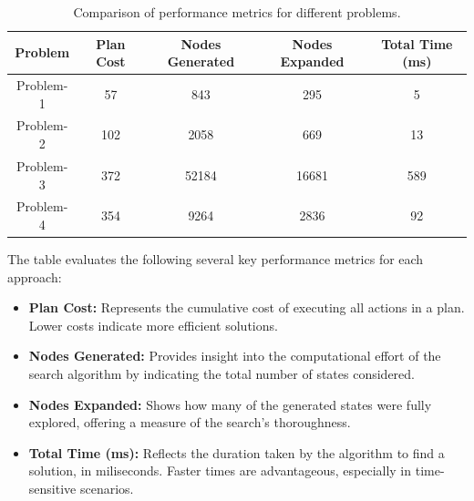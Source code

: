 \documentclass{article}
\begin{document}
\begin{table}[ht]
    \centering
    \small
    \begin{tabular}{|c|c|c|c|c|}
        \hline
        \textbf{Problem} & \textbf{Plan Cost} & \textbf{Nodes Generated} & \textbf{Nodes Expanded} & \textbf{Total Time (ms)} \\
        \hline
        Problem-1 & 57 & 843 & 295 & 5 \\
                                   
        \hline
        Problem-2 & 102 & 2058 & 669 & 13 \\
                                   
        \hline
        Problem-3 & 372 & 52184 & 16681 & 589 \\
                                   
        \hline
        Problem-4 & 354 & 9264 & 2836 & 92 \\
                                   
        \hline
    \end{tabular}
    \caption{Comparison of performance metrics for different problems.}
    \label{tab:results}
\end{table}

The table evaluates the following several key performance metrics for each approach:

\begin{itemize}
    \item \textbf{Plan Cost:} Represents the cumulative cost of executing all actions in a plan. Lower costs indicate more efficient solutions.
    
    \item \textbf{Nodes Generated:} Provides insight into the computational effort of the search algorithm by indicating the total number of states considered.
    
    \item \textbf{Nodes Expanded:} Shows how many of the generated states were fully explored, offering a measure of the search's thoroughness.
    
    \item \textbf{Total Time (ms):} Reflects the duration taken by the algorithm to find a solution, in miliseconds. Faster times are advantageous, especially in time-sensitive scenarios.
\end{itemize}
\end{document}
